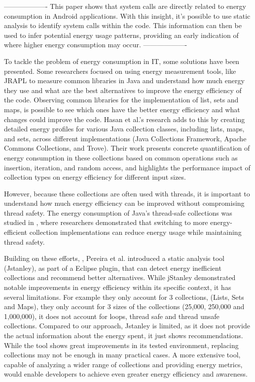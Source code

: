 \documentclass[sigplan]{acmart}
\begin{document}
-------------------
This paper\cite{aggarwal2014power} shows that system calls are directly related to energy consumption in Android applications. With this insight, it's possible to use static analysis to identify system calls within the code. This information can then be used to infer potential energy usage patterns, providing an early indication of where higher energy consumption may occur.
-------------------


To tackle the problem of energy consumption in IT, some solutions have been presented. Some researchers focused on using energy measurement tools, like JRAPL to measure common libraries in Java and understand how much energy they use and what are the best alternatives to improve the energy efficiency of the code\cite{10.1145/2896967.2896968}. Observing common libraries for the implementation of list, sets and maps, is possible to see which ones have the better energy efficiency and what changes could improve the code.
Hasan et al.'s \cite{10.1145/2884781.2884869} research adds to this by creating detailed energy profiles for various Java collection classes, including lists, maps, and sets, across different implementations (Java Collections Framework, Apache Commons Collections, and Trove). Their work presents concrete quantification of energy consumption in these collections based on common operations such as insertion, iteration, and random access, and highlights the performance impact of collection types on energy efficiency for different input sizes.

However, because these collections are often used with threads, it is important to understand how much energy efficiency can be improved without compromising thread safety. The energy consumption of Java's thread-safe collections was studied in \cite{7816451}, where researchers demonstrated that switching to more energy-efficient collection implementations can reduce energy usage while maintaining thread safety.

Building on these efforts, \cite{10.1145/3238147.3240473}, Pereira et al. introduced a static analysis tool (Jstanley), as part of a Eclipse plugin, that can detect energy inefficient collections and recommend better alternatives. While jStanley demonstrated notable improvements in energy efficiency within its specific context, it has several limitations.
For example they only account for 3 collections, (Lists, Sets and Maps), they only account for 3 sizes of the collections (25,000, 250,000 and 1,000,000), it does not account for loops, thread safe and thread unsafe collections. Compared to our approach, Jstanley is limited, as it does not provide the actual information about the energy spent, it just shows recommendations. While the tool shows great improvements in its tested environment, replacing collections may not be enough in many practical cases. A more extensive tool, capable of analyzing a wider range of collections and providing energy metrics, would enable developers to achieve even greater energy efficiency and awareness.
\end{document}
